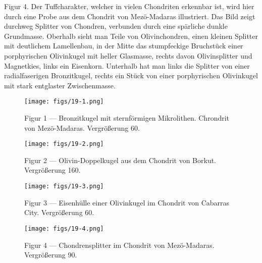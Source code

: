 \documentclass[a4paper, 11pt, oneside, polutonikogreek, german]{article}
\begin{document}
Figur 4. Der Tuffcharakter, welcher in vielen Chondriten erkennbar ist, wird hier durch eine Probe aus dem Chondrit von Mezö-Madaras illustriert. Das Bild zeigt durchweg Splitter von Chondren, verbunden durch eine spärliche dunkle Grundmasse. Oberhalb sieht man Teile von Olivinchondren, einen kleinen Splitter mit deutlichem Lamellenbau, in der Mitte das stumpfeckige Bruchstück einer porphyrischen Olivinkugel mit heller Glasmasse, rechts davon Olivinsplitter und Magnetkies, links ein Eisenkorn. Unterhalb hat man links die Splitter von einer radialfaserigen Bronzitkugel, rechts ein Stück von einer porphyrischen Olivinkugel mit stark entglaster Zwischenmasse.
\clearpage

\vspace*{\fill}
\begin{figure}[H]
\centering
\texttt{[image: figs/19-1.png]}
\caption{\small Figur 1 --- Bronzitkugel mit sternförmigen Mikrolithen. Chrondrit von Mezö-Madaras. Vergrößerung 60.}
\end{figure}
\vspace*{\fill}
\clearpage

\vspace*{\fill}
\begin{figure}[H]
\centering
\texttt{[image: figs/19-2.png]}
\caption{\small Figur 2 --- Olivin-Doppelkugel aus dem Chondrit von Borkut. Vergrößerung 160.}
\end{figure}
\vspace*{\fill}
\clearpage

\vspace*{\fill}
\begin{figure}[H]
\centering
\texttt{[image: figs/19-3.png]}
\caption{\small Figur 3 --- Eisenhülle einer Olivinkugel im Chondrit von Cabarras City. Vergrößerung 60.}
\end{figure}
\vspace*{\fill}
\clearpage

\vspace*{\fill}
\begin{figure}[H]
\centering
\texttt{[image: figs/19-4.png]}
\caption{\small Figur 4 --- Chondrensplitter im Chondrit von Mezö-Madaras. Vergrößerung 90.}
\end{figure}
\vspace*{\fill}
\clearpage
\end{document}
